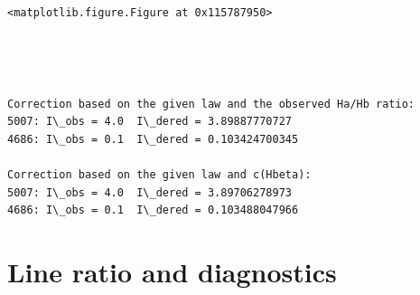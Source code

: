 \documentclass{report}
\begin{document}
    
    \begin{verbatim}
<matplotlib.figure.Figure at 0x115787950>
    \end{verbatim}

    
    \begin{center}
    \end{center}
    { \hspace*{\fill} \\}
    
    \begin{center}
    \end{center}
    { \hspace*{\fill} \\}
    
    \begin{Verbatim}[commandchars=\\\{\}]
Correction based on the given law and the observed Ha/Hb ratio:
5007: I\_obs = 4.0  I\_dered = 3.89887770727
4686: I\_obs = 0.1  I\_dered = 0.103424700345

Correction based on the given law and c(Hbeta):
5007: I\_obs = 4.0  I\_dered = 3.89706278973
4686: I\_obs = 0.1  I\_dered = 0.103488047966

    \end{Verbatim}

\section{Line ratio and diagnostics}\label{line-ratio-and-diagnostics}
\end{document}
